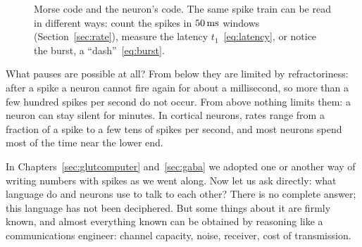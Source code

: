 \begin{figure}[t]
\centering
{}
\caption{Morse code and the neuron's code. The same spike train can be read in different ways: count the spikes in $50\,\text{ms}$ windows (Section~\ref{sec:rate}), measure the latency $t_1$~\eqref{eq:latency}, or notice the burst, a ``dash''~\eqref{eq:burst}.}
\label{fig:morse}
\end{figure}

What pauses are possible at all? From below they are limited by refractoriness: after a spike a neuron cannot fire again for about a millisecond, so more than a few hundred spikes per second do not occur. From above nothing limits them: a neuron can stay silent for minutes. In cortical  neurons, rates range from a fraction of a spike to a few tens of spikes per second, and most neurons spend most of the time near the lower end.

In Chapters~\ref{sec:glutcomputer} and~\ref{sec:gaba} we adopted one or another way of writing numbers with spikes as we went along. Now let us ask directly: what language do  and  neurons use to talk to each other? There is no complete answer; this language has not been deciphered. But some things about it are firmly known, and almost everything known can be obtained by reasoning like a communications engineer: channel capacity, noise, receiver, cost of transmission.

